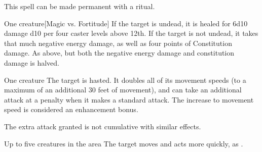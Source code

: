 This spell can be made permanent with a  ritual.

\begin{comment}
\subsubsection{H}
\end{comment}

\spellrng{\rngclose}
\begin{spelltarget}{One creature}[Magic vs. Fortitude]
    \spelleffect If the target is undead, it is healed for 6d10 damage \add d10 per four caster levels above 12th.
    \spellsuccess If the target is not undead, it takes that much negative energy damage, as well as four points of Constitution damage.
    \spellfailure As above, but both the negative energy damage and constitution damage is halved.
\end{spelltarget}

\spelldur{\durshort}
\begin{spelltarget}{One creature}
    \spelleffect The target is hasted. It doubles all of its movement speeds (to a maximum of an additional 30 feet of movement), and can take an additional attack at a  penalty when it makes a standard attack. The increase to movement speed is considered an enhancement bonus.
\end{spelltarget}
\spellnotes The extra attack granted is not cumulative with similar effects.

\begin{spelltargets}{Up to five creatures in the area}
    \spelleffect The target moves and acts more quickly, as .
\end{spelltargets}

